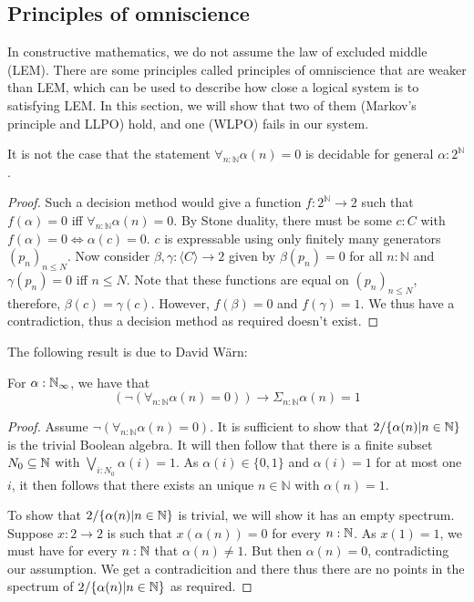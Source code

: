 \subsection{Principles of omniscience}
In constructive mathematics, we do not assume the law of excluded middle (LEM).
There are some principles called principles of omniscience that are weaker than LEM, which can be used to describe 
how close a logical system is to satisfying LEM.
In this section, we will show that two of them (Markov's principle and LLPO) hold, 
and one (WLPO) fails in our system.

\begin{theorem}\label{NotWLPO}
  It is not the case that the statement %
  $\forall_{n:\mathbb N} \alpha(n) = 0$ is decidable for general $\alpha:2^\mathbb N$. 
\end{theorem}
\begin{proof}
  Such a decision method would give a function $f:2^\mathbb N \to 2$ such that 
  $f(\alpha) = 0$ iff $\forall_{n:\mathbb N} \alpha (n)= 0$. 
  By Stone duality, there must be some $c:C$ with 
  $f(\alpha) = 0 \iff \alpha(c) = 0$. 
  $c$ is expressable using only finitely many generators $(p_n)_{n\leq N}$. 
  Now consider $\beta,\gamma:\langle C \rangle \to 2$ given by $\beta(p_n) = 0$ for all $n:\mathbb N$ and
  $\gamma(p_n) = 0$ iff $n\leq N$. 
  Note that these functions are equal on $(p_n)_{n\leq N}$, therefore, $\beta(c) = \gamma(c)$. 
  However, $f(\beta) = 0$ and $f(\gamma) = 1$.
  We thus have a contradiction, thus a decision method as required doesn't exist. 
\end{proof}

The following result is due to David W\"arn:
\begin{theorem}\label{MarkovPrinciple}
  For $\alpha:\mathbb{N}_{\infty}$, we have that 
  \begin{equation}
    (\neg (\forall_{n:\mathbb N} \alpha (n)= 0)) \to \Sigma_{n:\mathbb N} \alpha (n)= 1
  \end{equation}
\end{theorem}
\begin{proof}
  Assume $\neg (\forall_{n:\mathbb N} \alpha (n)= 0)$.
  It is sufficient to show that $2/\{\alpha(n)|n\in\mathbb{N}\}$ is the trivial Boolean algebra. 
  It will then follow that there is a finite subset $N_0\subseteq \mathbb{N}$ 
  with $\bigvee_{i:N_0} \alpha(i) = 1$.
  As $\alpha(i) \in \{0,1\}$ and $\alpha(i) = 1$ for at most one $i$, it then follows that 
  there exists an unique $n\in\mathbb N$ with $\alpha(n) = 1$. 

  To show that $2/\{\alpha(n)|n\in\mathbb{N}\}$ is trivial, we will show it has an empty spectrum. 
  Suppose $x: 2 \to 2$ is such that $x(\alpha(n)) = 0$ for every $n:\mathbb{N}$. 
  As $x(1) = 1$, we must have for every $n:\mathbb{N}$ that $\alpha(n) \neq 1$. 
  But then $\alpha(n) = 0$, contradicting our assumption. 
  We get a contradicition and there thus there are no points in the spectrum of $2/\{\alpha(n)|n\in\mathbb{N}\}$ as required. 
\end{proof}

